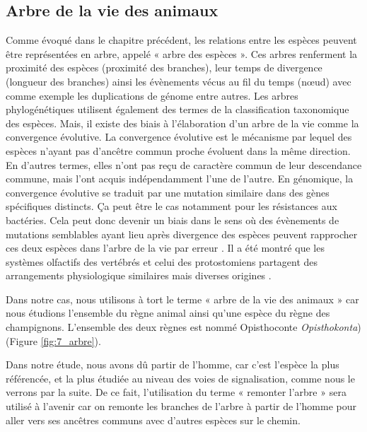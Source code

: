 \subsection{Arbre de la vie des animaux}\label{tree}
\par Comme évoqué dans le chapitre précédent, les relations entre les espèces peuvent être représentées en arbre, appelé « arbre des espèces ». Ces arbres renferment la proximité des espèces (proximité des branches), leur temps de divergence (longueur des branches) ainsi les évènements vécus au fil du temps (nœud) avec comme exemple les duplications de génome entre autres. Les arbres phylogénétiques utilisent également des termes de la classification taxonomique des espèces. 
Mais, il existe des biais à l’élaboration d’un arbre de la vie comme la convergence évolutive. La convergence évolutive est le mécanisme par lequel des espèces n’ayant pas d’ancêtre commun proche évoluent dans la même direction. En d’autres termes, elles n’ont pas reçu de caractère commun de leur descendance commune, mais l’ont acquis indépendamment l’une de l’autre. En génomique, la convergence évolutive se traduit par une mutation similaire dans des gènes spécifiques distincts. Ça peut être le cas notamment pour les résistances aux bactéries. Cela peut donc devenir un biais dans le sens où des évènements de mutations semblables ayant lieu après divergence des espèces peuvent rapprocher ces deux espèces dans l’arbre de la vie par erreur \parencite{christin_causes_2010}. Il a été montré que les systèmes olfactifs des vertébrés et celui des protostomiens partagent des arrangements physiologique similaires \parencite{hildebrand_mechanisms_1997} mais diverses origines \parencite{strausfeld_olfactory_1999}.
\par Dans notre cas, nous utilisons à tort le terme « arbre de la vie des animaux » car nous étudions l’ensemble du règne animal ainsi qu’une espèce du règne des champignons. L’ensemble des deux règnes est nommé Opisthoconte \textit{Opisthokonta}) (Figure \ref{fig:7_arbre}). 
\par Dans notre étude, nous avons dû partir de l’homme, car c’est l’espèce la plus référencée, et la plus étudiée au niveau des voies de signalisation, comme nous le verrons par la suite. De ce fait, l’utilisation du terme « remonter l’arbre » sera utilisé à l’avenir car on remonte les branches de l’arbre à partir de l’homme pour aller vers ses ancêtres communs avec d’autres espèces sur le chemin. 

